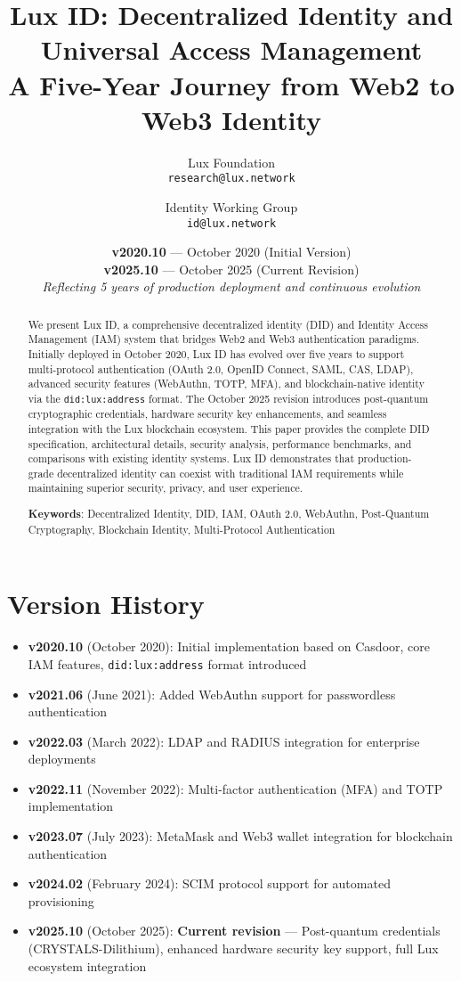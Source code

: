 \documentclass[11pt,a4paper]{article}
\title{
  \textbf{Lux ID: Decentralized Identity and Universal Access Management} \\
  \large A Five-Year Journey from Web2 to Web3 Identity
}
\author{
  Lux Foundation \\
  \texttt{research@lux.network} \\
  \and
  Identity Working Group \\
  \texttt{id@lux.network}
}
\date{
  \textbf{v2020.10} — October 2020 (Initial Version) \\
  \textbf{v2025.10} — October 2025 (Current Revision) \\
  \vspace{0.5cm}
  \textit{Reflecting 5 years of production deployment and continuous evolution}
}
\begin{document}
\maketitle

\begin{abstract}
We present Lux ID, a comprehensive decentralized identity (DID) and Identity Access Management (IAM) system that bridges Web2 and Web3 authentication paradigms. Initially deployed in October 2020, Lux ID has evolved over five years to support multi-protocol authentication (OAuth 2.0, OpenID Connect, SAML, CAS, LDAP), advanced security features (WebAuthn, TOTP, MFA), and blockchain-native identity via the \texttt{did:lux:address} format. The October 2025 revision introduces post-quantum cryptographic credentials, hardware security key enhancements, and seamless integration with the Lux blockchain ecosystem. This paper provides the complete DID specification, architectural details, security analysis, performance benchmarks, and comparisons with existing identity systems. Lux ID demonstrates that production-grade decentralized identity can coexist with traditional IAM requirements while maintaining superior security, privacy, and user experience.

\textbf{Keywords}: Decentralized Identity, DID, IAM, OAuth 2.0, WebAuthn, Post-Quantum Cryptography, Blockchain Identity, Multi-Protocol Authentication
\end{abstract}

\section*{Version History}

\begin{itemize}[leftmargin=*]
  \item \textbf{v2020.10} (October 2020): Initial implementation based on Casdoor, core IAM features, \texttt{did:lux:address} format introduced
  \item \textbf{v2021.06} (June 2021): Added WebAuthn support for passwordless authentication
  \item \textbf{v2022.03} (March 2022): LDAP and RADIUS integration for enterprise deployments
  \item \textbf{v2022.11} (November 2022): Multi-factor authentication (MFA) and TOTP implementation
  \item \textbf{v2023.07} (July 2023): MetaMask and Web3 wallet integration for blockchain authentication
  \item \textbf{v2024.02} (February 2024): SCIM protocol support for automated provisioning
  \item \textbf{v2025.10} (October 2025): \textbf{Current revision} — Post-quantum credentials (CRYSTALS-Dilithium), enhanced hardware security key support, full Lux ecosystem integration
\end{itemize}
\end{document}
